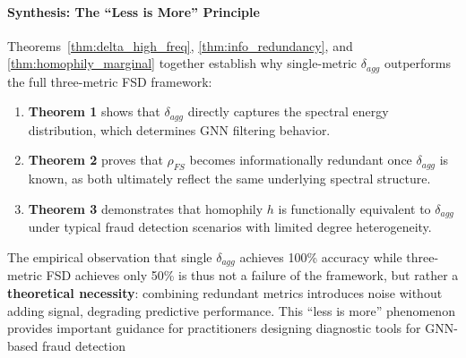 \paragraph{Synthesis: The ``Less is More'' Principle}
Theorems~\ref{thm:delta_high_freq}, \ref{thm:info_redundancy}, and \ref{thm:homophily_marginal} together establish why single-metric $\delta_{agg}$ outperforms the full three-metric FSD framework:

\begin{enumerate}
    \item \textbf{Theorem 1} shows that $\delta_{agg}$ directly captures the spectral energy distribution, which determines GNN filtering behavior.

    \item \textbf{Theorem 2} proves that $\rho_{FS}$ becomes informationally redundant once $\delta_{agg}$ is known, as both ultimately reflect the same underlying spectral structure.

    \item \textbf{Theorem 3} demonstrates that homophily $h$ is functionally equivalent to $\delta_{agg}$ under typical fraud detection scenarios with limited degree heterogeneity.
\end{enumerate}

The empirical observation that single $\delta_{agg}$ achieves 100\% accuracy while three-metric FSD achieves only 50\% is thus not a failure of the framework, but rather a \textbf{theoretical necessity}: combining redundant metrics introduces noise without adding signal, degrading predictive performance. This ``less is more'' phenomenon provides important guidance for practitioners designing diagnostic tools for GNN-based fraud detection
